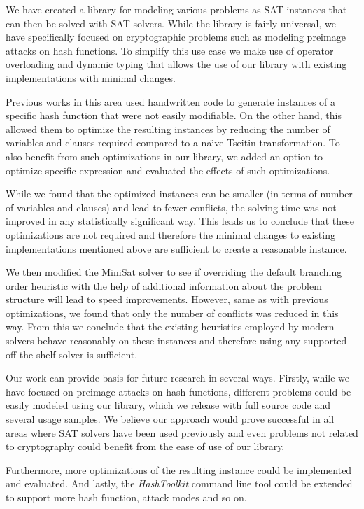 We have created a library for modeling various problems as SAT instances that can then be solved with SAT solvers.
While the library is fairly universal, we have specifically focused on cryptographic problems such as modeling preimage attacks on hash functions.
To simplify this use case we make use of operator overloading and dynamic typing that allows the use of our library with existing implementations with minimal changes.

Previous works in this area used handwritten code to generate instances of a specific hash function that were not easily modifiable.
On the other hand, this allowed them to optimize the resulting instances by reducing the number of variables and clauses required compared to a na\"{\i}ve Tseitin transformation.
To also benefit from such optimizations in our library, we added an option to optimize specific expression and evaluated the effects of such optimizations.

While we found that the optimized instances can be smaller (in terms of number of variables and clauses) and lead to fewer conflicts, the solving time was not improved in any statistically significant way.
This leads us to conclude that these optimizations are not required and therefore the minimal changes to existing implementations mentioned above are sufficient to create a reasonable instance.

We then modified the MiniSat solver to see if overriding the default branching order heuristic with the help of additional information about the problem structure will lead to speed improvements.
However, same as with previous optimizations, we found that only the number of conflicts was reduced in this way.
From this we conclude that the existing heuristics employed by modern solvers behave reasonably on these instances and therefore using any supported off-the-shelf solver is sufficient.

Our work can provide basis for future research in several ways.
Firstly, while we have focused on preimage attacks on hash functions, different problems could be easily modeled using our library, which we release with full source code and several usage samples.
We believe our approach would prove successful in all areas where SAT solvers have been used previously and even problems not related to cryptography could benefit from the ease of use of our library.

Furthermore, more optimizations of the resulting instance could be implemented and evaluated.
And lastly, the \emph{HashToolkit} command line tool could be extended to support more hash function, attack modes and so on.
